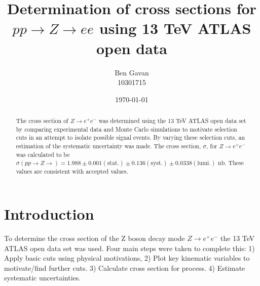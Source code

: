 \documentclass[%
 reprint,
 amsmath,amssymb,
 aps,
]{revtex4-2}
\begin{document}

\title{Determination of cross sections for $pp \rightarrow Z \rightarrow ee$ using 13 TeV ATLAS open data}

\author{Ben Gavan\\10301715}




\date{\today}%

\begin{abstract}
The cross section of $Z \rightarrow e^{+}e^{-}$ was determined using the 13 TeV ATLAS open data set by comparing experimental data and Monte Carlo simulations to motivate selection cuts in an attempt to isolate possible signal events. By varying these selection cuts, an estimation of the systematic uncertainty was made. The cross section, $\sigma$, for $Z \rightarrow e^{+}e^{-}$ was calculated to be {$\sigma (pp \rightarrow Z \rightarrow ) = 1.988\pm0.001 (\text{stat.}) \pm 0.136 (\text{syst.}) \pm 0.0338 (\text{lumi.}) \text{ nb}$}. These values are consistent with accepted values.
\end{abstract}

\maketitle

\section{Introduction}
To determine the cross section of the Z boson decay mode $Z \rightarrow e^{+}e^{-}$ the 13 TeV ATLAS open data set was used. Four main steps were taken to complete this: 1) Apply basic cuts using physical motivations, 2) Plot key kinematic variables to motivate/find further cuts. 3) Calculate cross section for process. 4) Estimate systematic uncertainties.
\end{document}
